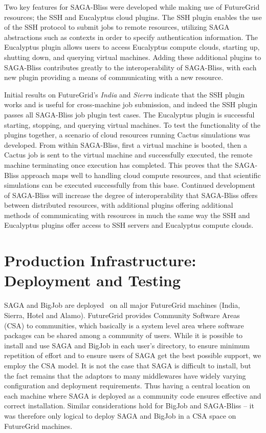 \documentclass[]{paper}
\begin{document}
Two key features for SAGA-Bliss were developed while making use of FutureGrid resources; the SSH and Eucalyptus cloud plugins.  The SSH plugin enables the use of the SSH protocol to submit jobs to remote resources, utilizing SAGA abstractions such as contexts in order to specify authentication information.  The Eucalyptus plugin allows users to access Eucalyptus compute clouds, starting up, shutting down, and querying virtual machines.  Adding these additional plugins to SAGA-Bliss contributes greatly to the interoperability of SAGA-Bliss, with each new plugin providing a means of communicating with a new resource.

Initial results on FutureGrid's \textit{India} and \textit{Sierra} indicate
that the SSH plugin works and is useful for cross-machine job submission, and
indeed the SSH plugin passes all SAGA-Bliss job plugin test cases.  The
Eucalyptus plugin is successful starting, stopping, and querying virtual
machines.  To test the functionality of the plugins together, a scenario of
cloud resources running Cactus simulations was developed.  From within
SAGA-Bliss, first a virtual machine is booted, then a Cactus job is sent to the
virtual machine and successfully executed, the remote machine terminating once
execution has completed.  This proves that the SAGA-Bliss approach maps well to
handling cloud compute resources, and that scientific simulations can be
executed successfully from this base.  Continued development of SAGA-Bliss will
increase the degree of interoperability that SAGA-Bliss offers between
distributed resources, with additional plugins offering additional methods of
communicating with resources in much the same way the SSH and Eucalyptus
plugins offer access to SSH servers and Eucalyptus compute clouds.


\section{Production Infrastructure: Deployment and Testing}

SAGA and BigJob are deployed~\cite{saga-depl} on all major FutureGrid machines (India, Sierra, Hotel and Alamo).  FutureGrid provides Community Software Areas (CSA) to communities, which basically is a system level area where software packages can be shared among a community of users.  While it is possible to install and use SAGA and BigJob in each user's directory, to ensure minimum repetition of effort and to ensure users of SAGA get the best possible support, we employ the CSA model.  It is not the case that SAGA is difficult to install, but the fact remains that the adaptors to many middlewares have widely varying configuration and deployment requirements.  Thus having a central location on each machine where SAGA is deployed as a community code ensures effective and correct installation.  Similar considerations hold for BigJob and SAGA-Bliss -- it was therefore only logical to deploy SAGA and BigJob in a CSA space on FutureGrid machines.
\end{document}
